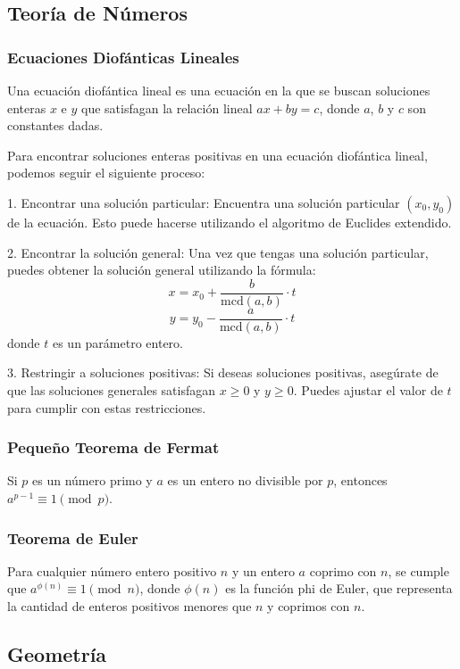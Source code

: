\subsection{Teoría de Números}
\subsubsection{Ecuaciones Diofánticas Lineales}
Una ecuación diofántica lineal es una ecuación en la que se buscan soluciones enteras $x$ e $y$ que satisfagan la relación lineal $ax + by = c$, donde $a$, $b$ y $c$ son constantes dadas.

Para encontrar soluciones enteras positivas en una ecuación diofántica lineal, podemos seguir el siguiente proceso:

1. Encontrar una solución particular: Encuentra una solución particular $(x_0, y_0)$ de la ecuación. Esto puede hacerse utilizando el algoritmo de Euclides extendido.

2. Encontrar la solución general: Una vez que tengas una solución particular, puedes obtener la solución general utilizando la fórmula:
\[ x = x_0 + \frac{b}{\text{mcd}(a, b)} \cdot t \]
\[ y = y_0 - \frac{a}{\text{mcd}(a, b)} \cdot t \]
donde $t$ es un parámetro entero.

3. Restringir a soluciones positivas: Si deseas soluciones positivas, asegúrate de que las soluciones generales satisfagan $x \geq 0$ y $y \geq 0$. Puedes ajustar el valor de $t$ para cumplir con estas restricciones.

\subsubsection{Pequeño Teorema de Fermat}
Si $p$ es un número primo y $a$ es un entero no divisible por $p$, entonces $a^{p-1} \equiv 1 \pmod{p}$.

\subsubsection{Teorema de Euler}
Para cualquier número entero positivo $n$ y un entero $a$ coprimo con $n$, se cumple que $a^{\phi(n)} \equiv 1 \pmod{n}$, donde $\phi(n)$ es la función phi de Euler, que representa la cantidad de enteros positivos menores que $n$ y coprimos con $n$.

\subsection{Geometría}

